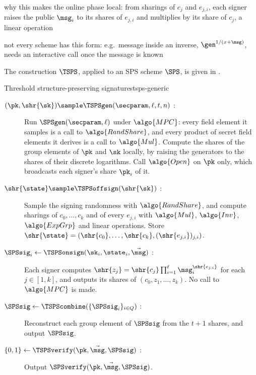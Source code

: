 \begin{outline}
  \item why this makes the online phase local: from sharings of $c_j$ and
$e_{j,i}$, each signer raises the public $\msg_i$ to its shares of $e_{j,i}$ and
multiplies by its share of $c_j$, a linear operation
  \item not every scheme has this form: e.g.\ message inside an inverse,
$\gen^{1/(x+\msg)}$, needs an interactive call once the message is known
\end{outline}

The construction $\TSPS$, applied to an SPS scheme $\SPS$, is given in
.

\begin{protocolbox}{Threshold structure-preserving signatures}{tsps-generic}

  \begin{description}

    \item[$(\pk, \shr{\sk}) \sample \TSPSgen(\secparam, \ell, t, n)$ :] Run
$\SPSgen(\secparam, \ell)$ under $\algo{MPC}$: every field element it samples is
a call to $\algo{RandShare}$, and every product of secret field elements it
derives is a call to $\algo{Mul}$. Compute the shares of the group elements of
$\pk$ and $\sk$ locally, by raising the generators to the shares of their
discrete logarithms. Call $\algo{Open}$ on $\pk$ only, which broadcasts each
signer's share $\pk_i$ of it.

    \item[$\shr{\state} \sample \TSPSoffsign(\shr{\sk})$ :] Sample the signing
randomness with $\algo{RandShare}$, and compute sharings of $c_0, \ldots, c_k$
and of every $e_{j,i}$ with $\algo{Mul}$, $\algo{Inv}$, $\algo{ExpGrp}$ and
linear operations. Store $\shr{\state} = (\shr{c_0}, \ldots, \shr{c_k},
(\shr{e_{j,i}})_{j,i})$.

    \item[$\SPSsig_i \leftarrow \TSPSonsign(\sk_i, \state_i, \vec{\msg})$ :]
Each signer computes $\shr{z_j} = \shr{c_j} \prod_{i=1}^{\ell}
\msg_i^{\shr{e_{j,i}}}$ for each $j \in [1,k]$, and outputs its shares of $(c_0,
z_1, \ldots, z_k)$. No call to $\algo{MPC}$ is made.

    \item[$\SPSsig \leftarrow \TSPScombine(\{\SPSsig_i\}_{i \in Q})$ :]
Reconstruct each group element of $\SPSsig$ from the $t+1$ shares, and output
$\SPSsig$.

    \item[$\{0,1\} \leftarrow \TSPSverify(\pk, \vec{\msg}, \SPSsig)$ :] Output
$\SPSverify(\pk, \vec{\msg}, \SPSsig)$.

  \end{description}

\end{protocolbox}

